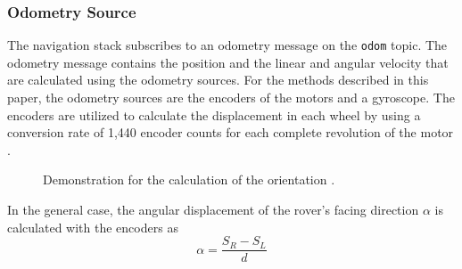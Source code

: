 \documentclass{article}
\begin{document}
          \subsubsection{Odometry Source}
          The navigation stack subscribes to an odometry message on the \verb|odom| topic. The odometry message contains the position and the linear and angular velocity that are calculated using the odometry sources. For the methods described in this paper, the odometry sources are the encoders of the motors and a gyroscope. The encoders are utilized to calculate the displacement in each wheel by using a conversion rate of 1,440 encoder counts for each complete revolution of the motor \cite{PololuEncoders}.
          \begin{figure}[H]
               \centering
               \caption[Odometry Calculation Demonstration]{Demonstration for the calculation of the orientation \cite{DiffSteering}.}
               \label{fig:odom-demo}
          \end{figure}
          In the general case, the angular displacement of the rover's facing direction $\alpha$ is calculated with the encoders as
          \begin{equation}
               \alpha = \frac{S_R-S_L}{d}
          \end{equation}
\end{document}

